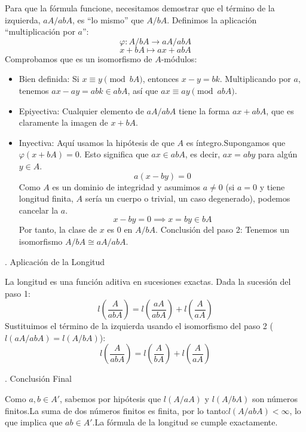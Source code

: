 \begin{enumerate}[1)]
    Para que la fórmula funcione, necesitamos demostrar que el término de la izquierda, $aA/abA$, es ``lo mismo'' que $A/bA$. Definimos la aplicación ``multiplicación por $a$'':$$\varphi: A/bA \longrightarrow aA/abA$$$$x + bA \longmapsto ax + abA$$
    Comprobamos que es un isomorfismo de $A$-módulos:
    \begin{itemize}
        \item Bien definida: Si $x \equiv y \pmod{bA}$, entonces $x - y = bk$. Multiplicando por $a$, tenemos $ax - ay = abk \in abA$, así que $ax \equiv ay \pmod{abA}$.
        \item Epiyectiva: Cualquier elemento de $aA/abA$ tiene la forma $ax + abA$, que es claramente la imagen de $x + bA$.
        \item Inyectiva: Aquí usamos la hipótesis de que $A$ es íntegro.Supongamos que $\varphi(x + bA) = 0$. Esto significa que $ax \in abA$, es decir, $ax = aby$ para algún $y \in A$.$$a(x - by) = 0$$ Como $A$ es un dominio de integridad y asumimos $a \neq 0$ (si $a=0$ y tiene longitud finita, $A$ sería un cuerpo o trivial, un caso degenerado), podemos cancelar la $a$.
        $$x - by = 0 \implies x = by \in bA$$
        Por tanto, la clase de $x$ es $0$ en $A/bA$. Conclusión del paso 2: Tenemos un isomorfismo $A/bA \cong aA/abA$.
    \end{itemize}

     . Aplicación de la Longitud
    
    La longitud es una función aditiva en sucesiones exactas. Dada la sucesión del paso 1:$$l\left( \frac{A}{abA} \right) = l\left( \frac{aA}{abA} \right) + l\left( \frac{A}{aA} \right)$$Sustituimos el término de la izquierda usando el isomorfismo del paso 2 ($l(aA/abA) = l(A/bA)$):$$l\left( \frac{A}{abA} \right) = l\left( \frac{A}{bA} \right) + l\left( \frac{A}{aA} \right)$$
    
     . Conclusión Final
     
     Como $a, b \in A'$, sabemos por hipótesis que $l(A/aA)$ y $l(A/bA)$ son números finitos.La suma de dos números finitos es finita, por lo tanto:$l(A/abA) < \infty$, lo que implica que $ab \in A'$.La fórmula de la longitud se cumple exactamente.
\end{enumerate}